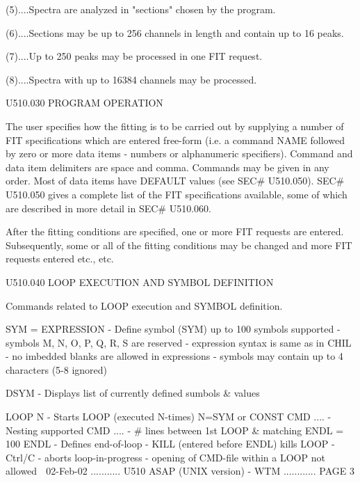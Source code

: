    (5)....Spectra are analyzed in "sections" chosen by the program.
 
   (6)....Sections may be up to 256 channels in length and contain  up  to  16
          peaks.
 
   (7)....Up to 250 peaks may be processed in one FIT request.
 
   (8)....Spectra with up to 16384 channels may be processed.
 
   U510.030  PROGRAM OPERATION
 
   The  user  specifies  how  the  fitting is to be carried out by supplying a
   number of FIT specifications which are entered free-form  (i.e.  a  command
   NAME  followed  by  zero  or  more  data  items  -  numbers or alphanumeric
   specifiers).  Command  and  data  item  delimiters  are  space  and  comma.
   Commands  may be given in any order. Most of data items have DEFAULT values
   (see SEC# U510.050). SEC#  U510.050  gives  a  complete  list  of  the  FIT
   specifications  available,  some  of  which are described in more detail in
   SEC# U510.060.
 
   After the fitting conditions are specified, one or more  FIT  requests  are
   entered.  Subsequently,  some  or  all  of  the  fitting  conditions may be
   changed and more FIT requests entered etc., etc.
 
   U510.040  LOOP EXECUTION AND SYMBOL DEFINITION
 
   Commands related to LOOP execution and SYMBOL definition.
 
   SYM = EXPRESSION - Define symbol (SYM) up to 100 symbols supported
                    - symbols M, N, O, P, Q, R, S are reserved
                    - expression syntax is same as in CHIL
                    - no imbedded blanks are allowed in expressions
                    - symbols may contain up to 4 characters (5-8 ignored)
 
   DSYM             - Displays list of currently defined sumbols & values
 
   LOOP N           - Starts LOOP (executed N-times) N=SYM or CONST
   CMD  ....        - Nesting supported
   CMD  ....        - # lines between 1st LOOP & matching ENDL = 100
   ENDL             - Defines end-of-loop
                    - KILL (entered before ENDL) kills LOOP
                    - Ctrl/C - aborts loop-in-progress
                    - opening of CMD-file within a LOOP not allowed
    
   02-Feb-02 ........... U510  ASAP (UNIX version) - WTM ............ PAGE   3
 
